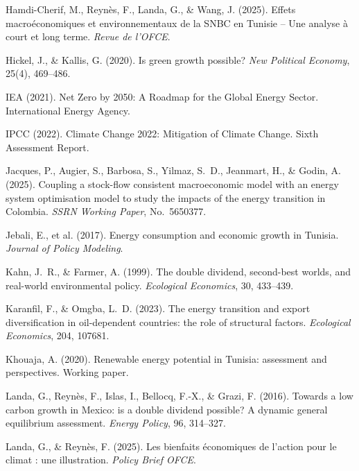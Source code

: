 \documentclass[12pt, a4paper]{article}
\begin{document}
\begin{enumerate}[label={[\arabic*]}, leftmargin=*]
\item Hamdi-Cherif, M., Reynès, F., Landa, G., \& Wang, J. (2025). Effets macroéconomiques et environnementaux de la SNBC en Tunisie -- Une analyse à court et long terme. \textit{Revue de l'OFCE}.

\item Hickel, J., \& Kallis, G. (2020). Is green growth possible? \textit{New Political Economy}, 25(4), 469--486.

\item IEA (2021). Net Zero by 2050: A Roadmap for the Global Energy Sector. International Energy Agency.

\item IPCC (2022). Climate Change 2022: Mitigation of Climate Change. Sixth Assessment Report.

\item Jacques, P., Augier, S., Barbosa, S., Yilmaz, S.~D., Jeanmart, H., \& Godin, A. (2025). Coupling a stock-flow consistent macroeconomic model with an energy system optimisation model to study the impacts of the energy transition in Colombia. \textit{SSRN Working Paper}, No.~5650377.

\item Jebali, E., et al. (2017). Energy consumption and economic growth in Tunisia. \textit{Journal of Policy Modeling}.

\item Kahn, J.~R., \& Farmer, A. (1999). The double dividend, second-best worlds, and real-world environmental policy. \textit{Ecological Economics}, 30, 433--439.

\item Karanfil, F., \& Omgba, L.~D. (2023). The energy transition and export diversification in oil-dependent countries: the role of structural factors. \textit{Ecological Economics}, 204, 107681.

\item Khouaja, A. (2020). Renewable energy potential in Tunisia: assessment and perspectives. Working paper.

\item Landa, G., Reynès, F., Islas, I., Bellocq, F.-X., \& Grazi, F. (2016). Towards a low carbon growth in Mexico: is a double dividend possible? A dynamic general equilibrium assessment. \textit{Energy Policy}, 96, 314--327.

\item Landa, G., \& Reynès, F. (2025). Les bienfaits économiques de l'action pour le climat : une illustration. \textit{Policy Brief OFCE}.


\end{enumerate}
\end{document}
